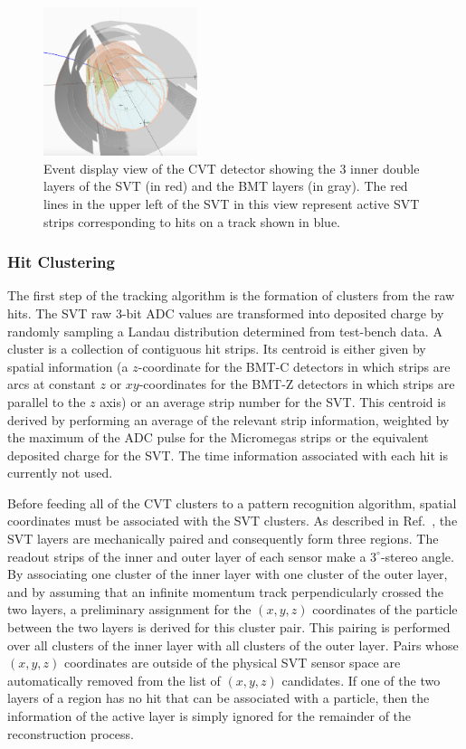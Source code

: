 \begin{figure}
\centering
\includegraphics[width=0.4\textwidth]{pics/cvt.png}
\caption{Event display view of the CVT detector showing the 3 inner double layers of the SVT (in red) and the
  BMT layers (in gray). The red lines in the upper left of the SVT in this view represent active SVT strips
  corresponding to hits on a track shown in blue.}
\label{fig:cvt}
\end{figure}

\subsubsection{Hit Clustering}

The first step of the tracking algorithm is the formation of clusters from the raw hits. The SVT raw 3-bit ADC
values are transformed into deposited charge by randomly sampling a Landau distribution determined from
test-bench data. A cluster is a collection of contiguous hit strips. Its centroid is either given by spatial information
(a $z$-coordinate for the BMT-C detectors in which strips are arcs at constant $z$ or $xy$-coordinates for the
BMT-Z detectors in which strips are parallel to the $z$ axis) or an average strip number for the SVT. This centroid
is derived by performing an average of the relevant strip information, weighted by the maximum of the ADC pulse for
the Micromegas strips or the equivalent deposited charge for the SVT. The time information associated with each hit
is currently not used.

Before feeding all of the CVT clusters to a pattern recognition algorithm, spatial coordinates must be associated with
the SVT clusters. As described in Ref.~\cite{svt-nim}, the SVT layers are mechanically paired and consequently form
three regions. The readout strips of the inner and outer layer of each sensor make a $3^\circ$-stereo angle. By
associating one cluster of the inner layer with one cluster of the outer layer, and by assuming that an infinite
momentum track perpendicularly crossed the two layers, a preliminary assignment for the $(x,y,z)$ coordinates of
the particle between the two layers is derived for this cluster pair. This pairing is performed over all clusters of the
inner layer with all clusters of the outer layer. Pairs whose $(x,y,z)$ coordinates are outside of the physical SVT
sensor space are automatically removed from the list of $(x,y,z)$ candidates. If one of the two layers of a region
has no hit that can be associated with a particle, then the information of the active layer is simply ignored for the
remainder of the reconstruction process.

